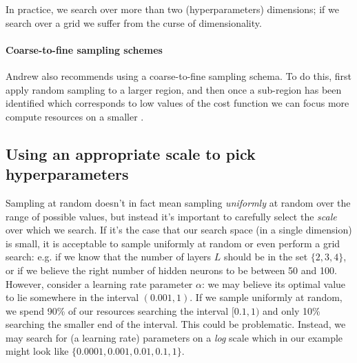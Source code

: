 \documentclass[12pt]{article}
\begin{document}
In practice, we search over more than two (hyperparameters) dimensions; if we search over a grid we suffer from
 the curse of dimensionality.

\paragraph{Coarse-to-fine sampling schemes} Andrew also recommends using a coarse-to-fine sampling schema.
To do this, first apply random sampling to a larger region, and then once a sub-region has been identified
which corresponds to low values of the cost function we can focus more compute resources on a smaller \color{blue}{area}\color{black}.

\begin{figure}[h]
\centering
{}
\end{figure}

\subsection{Using an appropriate scale to pick hyperparameters} Sampling at random doesn't in fact mean
sampling \emph{uniformly} at random over the range of possible values, 
but instead it's important to carefully select the \emph{scale} over which we search. If it's the case that our search space (in a single dimension) is small, it is acceptable to sample uniformly at random or even perform a grid search: e.g. if we know that the number of layers $L$ should be in the set $\{2, 3, 4\}$, or if we believe the right number of hidden neurons to be between 50 and 100. However, consider a learning rate parameter $\alpha$: we may believe its optimal value to lie somewhere in the interval $(0.001, 1)$. If we sample uniformly at random, we spend 90\% of our resources searching the interval $[0.1, 1)$ and only 10\% searching the smaller end of the interval. This could be problematic. Instead, we may search for (a learning rate) parameters on a \emph{log} scale which in our example might look like $\{0.0001, 0.001, 0.01, 0.1, 1\}$.
\end{document}
